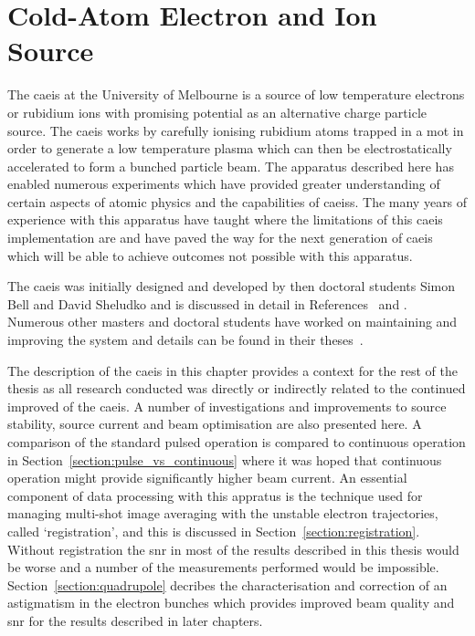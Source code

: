 \chapter{Cold-Atom Electron and Ion Source}\label{chapter:setup}

The \gls{caeis} at the University of Melbourne is a source of low temperature electrons or rubidium ions with promising potential as an alternative charge particle source.
The \gls{caeis} works by carefully ionising rubidium atoms trapped in a \gls{mot} in order to generate a low temperature plasma which can then be electrostatically accelerated to form a bunched particle beam.
The apparatus described here has enabled numerous experiments which have provided greater understanding of certain aspects of atomic physics and the capabilities of \glspl{caeis}.
The many years of experience with this apparatus have taught where the limitations of this \gls{caeis} implementation are and have paved the way for the next generation of \gls{caeis} which will be able to achieve outcomes not possible with this apparatus.

The \gls{caeis} was initially designed and developed by then doctoral students Simon Bell and David Sheludko and is discussed in detail in References~\cite{sheludko_shaped_2010} and \cite{bell_cold_2011}.
Numerous other masters and doctoral students have worked on maintaining and improving the system and details can be found in their theses~\cite{saliba_cold_2011,mcculloch_generation_2013,taylor_rydberg_2013,tielen_development_2015,murphy_measurement_2017,speirs_electron_2017}.

The description of the \gls{caeis} in this chapter provides a context for the rest of the thesis as all research conducted was directly or indirectly related to the continued improved of the \gls{caeis}.
A number of investigations and improvements to source stability, source current and beam optimisation are also presented here.
A comparison of the standard pulsed operation is compared to continuous operation in Section~\ref{section:pulse_vs_continuous} where it was hoped that continuous operation might provide significantly higher beam current.
An essential component of data processing with this appratus is the technique used for managing multi-shot image averaging with the unstable electron trajectories, called `registration', and this is discussed in Section~\ref{section:registration}.
Without registration the \gls{snr} in most of the results described in this thesis would be worse and a number of the measurements performed would be impossible.
Section~\ref{section:quadrupole} decribes the characterisation and correction of an astigmatism in the electron bunches which provides improved beam quality and \gls{snr} for the results described in later chapters.

